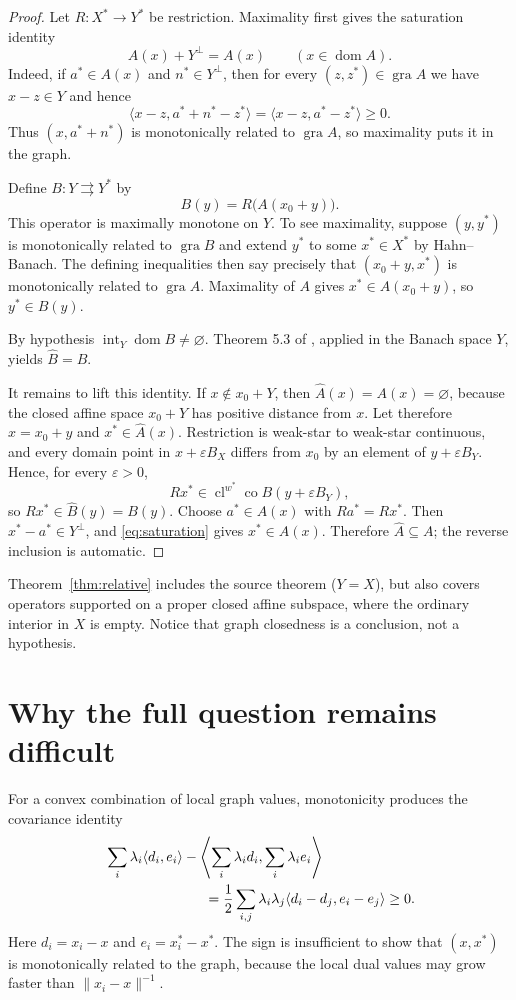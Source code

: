 \documentclass[11pt]{article}
\newcommand{\gra}{\operatorname{gra}}
\newcommand{\domn}{\operatorname{dom}}
\newcommand{\cl}{\operatorname{cl}}
\newcommand{\co}{\operatorname{co}}
\newcommand{\inte}{\operatorname{int}}
\begin{document}
\begin{proof}
Let $R:X^*\to Y^*$ be restriction.  Maximality first gives the saturation
identity
\begin{equation}\label{eq:saturation}
 A(x)+Y^\perp=A(x)\qquad(x\in\domn A).
\end{equation}
Indeed, if $a^*\in A(x)$ and $n^*\in Y^\perp$, then for every
$(z,z^*)\in\gra A$ we have $x-z\in Y$ and hence
\[
 \langle x-z,a^*+n^*-z^*\rangle
 =\langle x-z,a^*-z^*\rangle\ge0.
\]
Thus $(x,a^*+n^*)$ is monotonically related to $\gra A$, so maximality puts
it in the graph.

Define $B:Y\rightrightarrows Y^*$ by
\[
 B(y)=R\bigl(A(x_0+y)\bigr).
\]
This operator is maximally monotone on $Y$.  To see maximality, suppose
$(y,y^*)$ is monotonically related to $\gra B$ and extend $y^*$ to some
$x^*\in X^*$ by Hahn--Banach.  The defining inequalities then say precisely
that $(x_0+y,x^*)$ is monotonically related to $\gra A$.  Maximality of $A$
gives $x^*\in A(x_0+y)$, so $y^*\in B(y)$.

By hypothesis $\inte_Y\domn B\ne\varnothing$.  Theorem 5.3 of \cite{BY},
applied in the Banach space $Y$, yields $\widehat B=B$.

It remains to lift this identity.  If $x\notin x_0+Y$, then
$\widehat A(x)=A(x)=\varnothing$, because the closed affine space $x_0+Y$
has positive distance from $x$.  Let therefore $x=x_0+y$ and
$x^*\in\widehat A(x)$.  Restriction is weak-star to weak-star continuous,
and every domain point in $x+\varepsilon B_X$ differs from $x_0$ by an
element of $y+\varepsilon B_Y$.  Hence, for every $\varepsilon>0$,
\[
 Rx^*\in\cl^{w^*}\co B(y+\varepsilon B_Y),
\]
so $Rx^*\in\widehat B(y)=B(y)$.  Choose $a^*\in A(x)$ with
$Ra^*=Rx^*$.  Then $x^*-a^*\in Y^\perp$, and \eqref{eq:saturation} gives
$x^*\in A(x)$.  Therefore $\widehat A\subseteq A$; the reverse inclusion is
automatic.
\end{proof}

Theorem~\ref{thm:relative} includes the source theorem ($Y=X$), but also
covers operators supported on a proper closed affine subspace, where the
ordinary interior in $X$ is empty.  Notice that graph closedness is a
conclusion, not a hypothesis.

\section{Why the full question remains difficult}

For a convex combination of local graph values, monotonicity produces the
covariance identity
\begin{align*}
 &\sum_i\lambda_i\langle d_i,e_i\rangle
 -\left\langle\sum_i\lambda_i d_i,
                    \sum_i\lambda_i e_i\right\rangle\\
 &\hspace{25mm}=\frac12\sum_{i,j}\lambda_i\lambda_j
 \langle d_i-d_j,e_i-e_j\rangle\ge0.
\end{align*}
Here $d_i=x_i-x$ and $e_i=x_i^*-x^*$.  The sign is insufficient to show
that $(x,x^*)$ is monotonically related to the graph, because the local dual
values may grow faster than $\|x_i-x\|^{-1}$.
\end{document}
